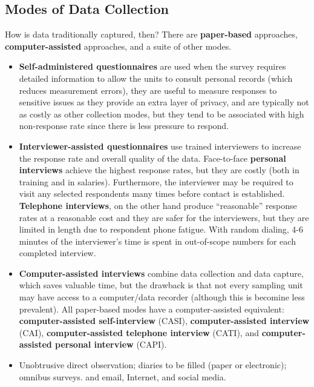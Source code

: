 \subsection{Modes of Data Collection}
How is data traditionally captured, then? There are \textbf{paper-based} approaches, \textbf{computer-assisted} approaches, and a suite of other modes.  
\begin{itemize}
\item \textbf{Self-administered questionnaires} are used when the survey requires detailed information to allow the units to consult personal records (which reduces measurement errors), they are useful to measure responses to sensitive issues as they provide an extra layer of privacy, and are typically not as costly as other collection modes, but they tend to be associated with high non-response rate since there is less pressure to respond. 
\item \textbf{Interviewer-assisted questionnaires} use trained interviewers to  increase the response rate and overall quality of the data. Face-to-face \textbf{personal interviews} achieve the highest response rates, but they are costly (both in training and in salaries). Furthermore, the interviewer may be required to visit any selected respondents many times before contact is established. \textbf{Telephone interviews}, on the other hand produce ``reasonable'' response rates at a reasonable cost and they are safer for the interviewers, but they are limited in length due to respondent phone fatigue. With random dialing, 4-6 minutes of the interviewer's time is spent in out-of-scope numbers for each completed interview.
\item \textbf{Com\-puter-assisted interviews} combine data collection and data capture, which saves valuable time, but the drawback is that not every sampling unit may have access to a computer/data recorder (although this is becomine less prevalent). All paper-based modes have a computer-assisted equivalent: \textbf{com\-puter-as\-sisted self-interview} (CASI), \textbf{com\-puter-as\-sisted interview} (CAI),  \textbf{com\-puter-as\-sisted tele\-phone interview} (CATI), and 
\textbf{com\-puter-as\-sisted personal interview} (CAPI).
\item Unobtrusive direct observation; diaries to be filled (paper or electronic); omnibus surveys. and email, Internet, and social media.
\end{itemize}
